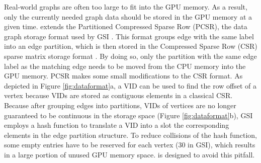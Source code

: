 %
Real-world graphs are often too large to fit into the GPU memory. As a result, only the currently needed graph data should be stored in the
GPU memory at a given time. \SystemName extends the Partitioned Compressed Sparse Row (PCSR), the data graph storage format used by GSI
\cite{zeng2020gsi}. This format groups edge with the same label into an edge partition, which is then stored in the Compressed Sparse Row
(CSR) sparse matrix storage format \FIXME{\cite{}}. By doing so, only the partition with the same edge label as the matching edge needs to
be moved from the CPU memory into the GPU memory. PCSR makes some small modifications to the CSR format. As depicted in Figure
\ref{fig:dataformat}a, a VID can be used to find the row offset of a vertex because VIDs are stored as contiguous elements in a classical
CSR. Because after grouping edges into partitions, VIDs of vertices are no longer guaranteed to be continuous in the storage space (Figure
\ref{fig:dataformat}b), GSI employs a hash function to translate a VID into a slot the corresponding elements in the edge partition
structure. To reduce collisions of the hash function, some empty entries have to be reserved for each vertex (30 in GSI), which results in
a large portion of unused GPU memory space. \SystemName is designed to avoid this pitfall.


